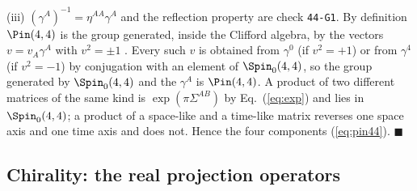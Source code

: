 (iii) $(\gamma^A)^{-1}=\eta^{AA}\gamma^A$ and the reflection property are check \texttt{44-G1}. By
definition $\Pin(4,4)$ is the group generated, inside the Clifford algebra, by the vectors
$v=v_A\gamma^A$ with $v^2=\pm1$ \cite{AtiyahBottShapiro1964,LawsonMichelsohn1989}. Every such $v$ is
obtained from $\gamma^0$ (if $v^2=+1$) or from $\gamma^4$ (if $v^2=-1$) by conjugation with an element
of $\Spin_0(4,4)$, so the group generated by $\Spin_0(4,4)$ and the $\gamma^A$ is $\Pin(4,4)$. A
product of two different matrices of the same kind is $\exp(\pi\Sigma^{AB})$ by Eq.~(\ref{eq:exp})
and lies in $\Spin_0(4,4)$; a product of a space-like and a time-like matrix reverses one space axis
and one time axis and does not. Hence the four components (\ref{eq:pin44}). $\blacksquare$

\subsection{Chirality: the real projection operators}
\label{sec:chirality}

